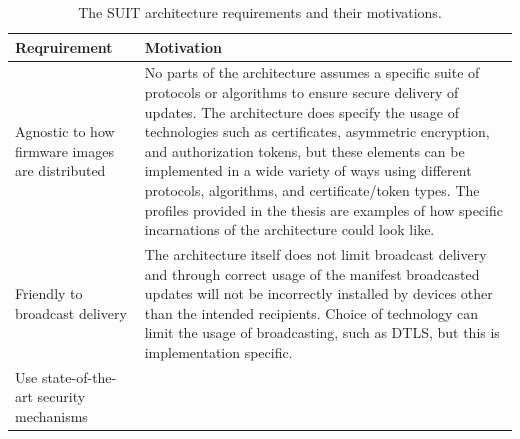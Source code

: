 \documentclass[0-thesis.tex]{subfiles}
\begin{document}
\begin{longtable}[]{@{}ll@{}}
    \caption{The SUIT architecture requirements and their motivations.}
    \label{tab:architecture-evaluation}\\
    \toprule
    \begin{minipage}[b]{0.41\columnwidth}\raggedright\strut
    Reqruirement\strut
    \end{minipage} & \begin{minipage}[b]{0.53\columnwidth}\raggedright\strut
    Motivation\strut
    \end{minipage}\tabularnewline
    \midrule
    \endhead
    \begin{minipage}[t]{0.41\columnwidth}\raggedright\strut
    Agnostic to how firmware images are distributed\strut
    \end{minipage} & \begin{minipage}[t]{0.53\columnwidth}\raggedright\strut
    No parts of the architecture assumes a specific suite of protocols or
    algorithms to ensure secure delivery of updates. The architecture does
    specify the usage of technologies such as certificates, asymmetric
    encryption, and authorization tokens, but these elements can be
    implemented in a wide variety of ways using different protocols,
    algorithms, and certificate/token types. The profiles provided in the
    thesis are examples of how specific incarnations of the architecture
    could look like.\strut
    \end{minipage}\tabularnewline
    \begin{minipage}[t]{0.41\columnwidth}\raggedright\strut
    Friendly to broadcast delivery\strut
    \end{minipage} & \begin{minipage}[t]{0.53\columnwidth}\raggedright\strut
    The architecture itself does not limit broadcast delivery and through
    correct usage of the manifest broadcasted updates will not be
    incorrectly installed by devices other than the intended recipients.
    Choice of technology can limit the usage of broadcasting, such as DTLS,
    but this is implementation specific.\strut
    \end{minipage}\tabularnewline
    \begin{minipage}[t]{0.41\columnwidth}\raggedright\strut
    Use state-of-the-art security mechanisms\strut
    \end{minipage} & \begin{minipage}[t]{0.53\columnwidth}\raggedright\strut

\end{minipage}
\end{longtable}
\end{document}
